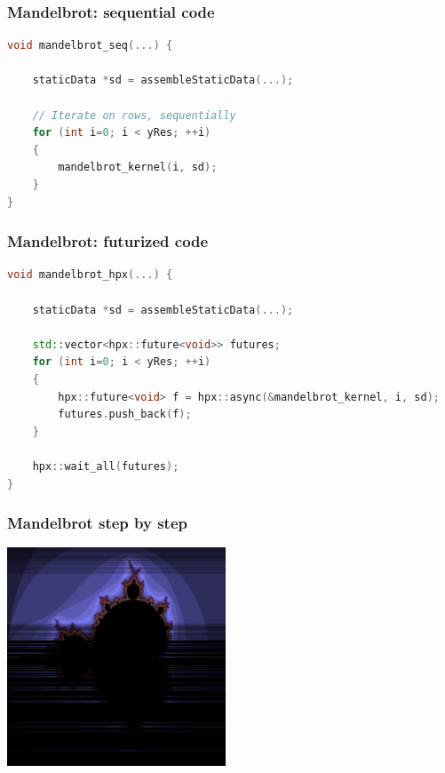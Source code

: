 \documentclass[compress]{beamer}
\begin{document}
\begin{frame}[fragile]
	\frametitle{Mandelbrot: sequential code}
\begin{lstlisting}[language=C]
void mandelbrot_seq(...) {

	staticData *sd = assembleStaticData(...);

	// Iterate on rows, sequentially
	for (int i=0; i < yRes; ++i)
	{
		mandelbrot_kernel(i, sd);
	}
}
\end{lstlisting}
\end{frame}

\begin{frame}[fragile]
	\frametitle{Mandelbrot: futurized code}
	\begin{lstlisting}[language=C++]
void mandelbrot_hpx(...) {

	staticData *sd = assembleStaticData(...);

	std::vector<hpx::future<void>> futures;
	for (int i=0; i < yRes; ++i)
	{
		hpx::future<void> f = hpx::async(&mandelbrot_kernel, i, sd);
		futures.push_back(f);
	}

	hpx::wait_all(futures);
}
\end{lstlisting}
\end{frame}

\begin{frame}
	\frametitle{Mandelbrot step by step}
	\begin{center}
		\includegraphics[width=65mm]{Figures/mandelbrot_partial.png}
	\end{center}
\end{frame}
\end{document}
